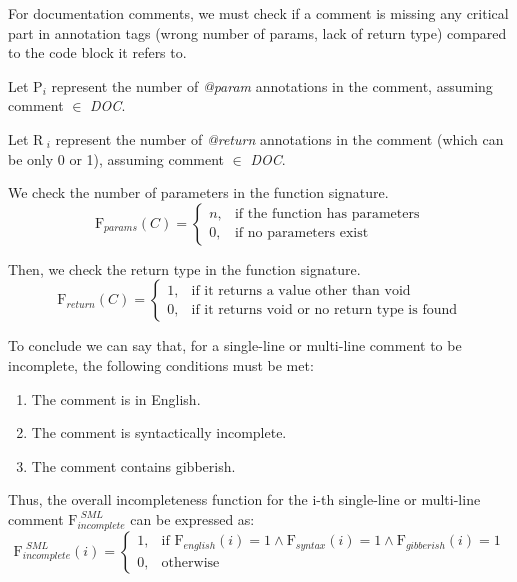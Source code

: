 \noindent For documentation comments, we must check if a comment is missing any critical part in annotation tags (wrong number of params, lack of return type) compared to the code block it refers to.

\noindent Let $\mathrm{P}_{i}$ represent the number of \textit{@param} annotations in the comment, assuming comment $\in$ \textit{DOC}.

\noindent Let $\mathrm{R}_{\textit{ i}}$ represent the number of \textit{@return} annotations in the comment (which can be only 0 or 1), assuming comment $\in$ \textit{DOC}.

\noindent We check the number of parameters in the function signature.
\begin{equation*}
	\mathrm{F}_{params}(C) = \begin{cases}
		n, & \text{if the function has parameters} \\
		0, & \text{if no parameters exist}
	\end{cases}
\end{equation*}

\noindent Then, we check the return type in the function signature.
\begin{equation*}
	\mathrm{F}_{return}(C) = \begin{cases}
		1, & \text{if it returns a value other than void
		} \\
		0, & \text{if it returns void or no return type is found}
	\end{cases}
\end{equation*}

\noindent To conclude we can say that, for a single-line or multi-line comment to be incomplete, the following conditions must be met:
	\begin{enumerate}
		\item The comment is in English.
		\item The comment is syntactically incomplete.
		\item The comment contains gibberish.
	\end{enumerate}
	
\noindent Thus, the overall incompleteness function for the i-th single-line or multi-line comment $\mathrm{F}_{incomplete}^{\textit{ SML}}$ \text{} can be expressed as:
\begin{equation*}
	\mathrm{F}_{incomplete}^{\textit{ SML}}(i) = \begin{cases}
		1, & \text{if } \mathrm{F}_{english}(i) = 1 \wedge \mathrm{F}_{syntax}(i) = 1 \wedge \mathrm{F}_{gibberish}(i) = 1 \\
		0, & \text{otherwise}
	\end{cases}
\end{equation*}

